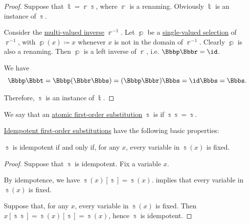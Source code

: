 \begin{proof}
  \NecessitySubProof* Suppose that \( \Bbbt = \Bbbr\Bbbs \), where \( \Bbbr \) is a renaming. Obviously \( \Bbbt \) is an instance of \( \Bbbs \).

  Consider the \hyperref[def:set_valued_map/inverse]{multi-valued inverse} \( \Bbbr^{-1} \). Let \( \Bbbp \) be a \hyperref[def:function/selection]{single-valued selection} of \( \Bbbr^{-1} \), with \( \Bbbp(x) \coloneqq x \) whenever \( x \) is not in the domain of \( \Bbbr^{-1} \). Clearly \( \Bbbp \) is also a renaming. Then \( \Bbbp \) is a left inverse of \( \Bbbr \), i.e. \( \Bbbp\Bbbr = \id \).

  We have
  \begin{equation*}
    \Bbbp\Bbbt
    =
    \Bbbp(\Bbbr\Bbbs)
    =
    (\Bbbp\Bbbr)\Bbbs
    =
    \id\Bbbs
    =
    \Bbbs.
  \end{equation*}

  Therefore, \( \Bbbs \) is an instance of \( \Bbbt \).
\end{proof}

\begin{definition}\label{def:fol_idempotent_substitution}
  We say that an \hyperref[def:atomic_fol_substitution]{atomic first-order substitution} \( \Bbbs \) is  if \( \Bbbs\Bbbs = \Bbbs \).
\end{definition}

\begin{proposition}\label{thm:def:fol_idempotent_substitution}
  \hyperref[def:fol_idempotent_substitution]{Idempotent first-order substitutions} have the following basic properties:
  \begin{thmenum}
     \( \Bbbs \) is idempotent if and only if, for any \( x \), every variable in \( \Bbbs(x) \) is fixed.
  \end{thmenum}
\end{proposition}
\begin{proof}
  \SufficiencySubProof* Suppose that \( \Bbbs \) is idempotent. Fix a variable \( x \).

  By idempotence, we have \( \Bbbs(x)[\Bbbs] = \Bbbs(x) \).  implies that every variable in \( \Bbbs(x) \) is fixed.

  \NecessitySubProof* Suppose that, for any \( x \), every variable in \( \Bbbs(x) \) is fixed. Then \( x[\Bbbs\Bbbs] = \Bbbs(x)[\Bbbs] = \Bbbs(x) \), hence \( \Bbbs \) is idempotent.
\end{proof}

